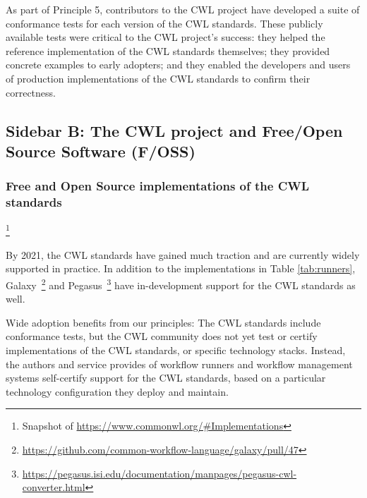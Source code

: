 \documentclass[sigconf,revew,screen,timestamp,nonacm]{acmart}
\newcommand{\addition}[1]{{\color{brown} #1}}
\newcommand{\modification}[1]{{\color{blue} #1}}
\newcommand{\todortwo}[1]{\todo[linecolor=white,color=KamPurple!40]{R2.#1}}
\begin{document}
As part of Principle 5, contributors to the CWL project have developed a suite of conformance tests for each version of the CWL standards. These publicly available tests were critical to \addition{the} CWL \addition{project}'s success: they helped \todortwo{19}\modification{assess} the reference implementation of \modification{the CWL standards themselves}; they provided concrete examples to early adopters; and they enabled the developers and users of production implementations of the CWL standards to confirm their correctness.

\subsection{Sidebar B: The CWL \addition{project} and Free/Open Source Software (F/OSS)}\label{sec:sidebar:b}

\subsubsection{Free and Open Source implementations of \addition{the} CWL \addition{standards}}\footnote{Snapshot of \url{https://www.commonwl.org/\#Implementations}}

By 2021, \modification{the CWL standards have} gained much traction and \modification{are} currently widely supported in practice. In addition to the implementations in Table \ref{tab:runners}, Galaxy~\cite{afgan_galaxy_2018}\footnote{\url{https://github.com/common-workflow-language/galaxy/pull/47}} and Pegasus~\cite{deelman_pegasus_2015}\footnote{\url{https://pegasus.isi.edu/documentation/manpages/pegasus-cwl-converter.html}} have in-development support for \modification{the CWL standards} as well.

Wide adoption benefits from our principles: \modification{The CWL standards} include conformance tests, but the CWL community does not yet test or certify \modification{implementations of the CWL standards}, or specific technology stacks. Instead, \modification{the authors and service provides of workflow runners and workflow management systems} self-certify support for the CWL standards, based on a particular technology configuration they deploy and maintain.
\end{document}
